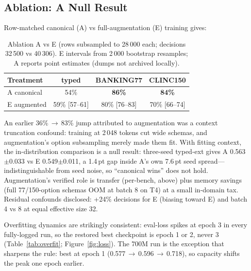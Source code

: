 \subsection{Ablation: A Null Result}
Row-matched canonical (A) vs full-augmentation (E) training gives:

\begin{table}[htbp]
\caption{Ablation A vs E (rows subsampled to 28\,000 each; decisions 32\,500 vs 40\,306).
E intervals from 2\,000 bootstrap resamples; A reports point estimates
(dumps not archived locally).}
\label{tab:ablation}
\begin{center}
\setlength{\tabcolsep}{4pt}
\begin{small}
\begin{tabular}{lccc}
\toprule
Treatment & typed & BANKING77 & CLINC150 \\
\midrule
A canonical & 54\% & \textbf{86\%} & \textbf{84\%} \\
E augmented & 59\% [57--61] & 80\% [76--83] & 70\% [66--74] \\
\bottomrule
\end{tabular}
\end{small}
\end{center}
\end{table}

An earlier 36\%\,$\to$\,83\% jump attributed to augmentation was a context
truncation confound: training at 2\,048 tokens cut wide schemas, and
augmentation's option subsampling merely made them fit. With fitting context,
the in-distribution comparison is a null result: three-seed typed-ext gives A
0.563$\pm$0.033 vs E 0.549$\pm$0.011, a 1.4\,pt gap inside A's own 7.6\,pt
seed spread---indistinguishable from seed noise, so ``canonical wins'' does
not hold. Augmentation's verified role is transfer (per-bench, above) plus memory
savings (full 77/150-option schemas OOM at batch 8 on T4) at a small in-domain
tax. Residual confounds disclosed: +24\% decisions for E (biasing toward E) and
batch 4 vs 8 at equal effective size 32.

Overfitting dynamics are strikingly consistent: eval-loss spikes at epoch 3 in
every fully-logged run, so the restored best checkpoint is epoch 1 or 2, never
3 (Table~\ref{tab:overfit}; Figure~\ref{fig:loss}). The 700M run is the
exception that sharpens the rule: best at epoch 1 (0.577\,$\to$\,0.596\,$\to$\,0.718),
so capacity shifts the peak one epoch earlier.

